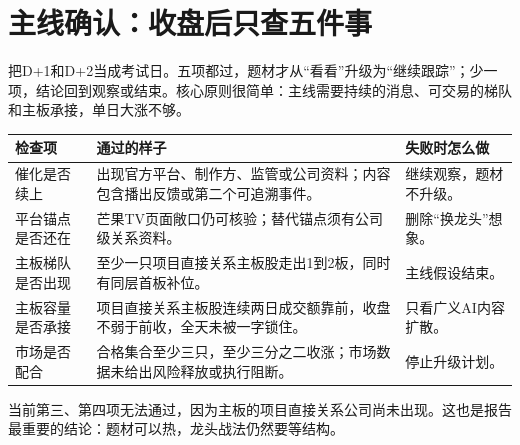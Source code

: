 \section{主线确认：收盘后只查五件事}

把D+1和D+2当成考试日。五项都过，题材才从“看看”升级为“继续跟踪”；少一项，结论回到观察或结束。核心原则很简单：主线需要持续的消息、可交易的梯队和主板承接，单日大涨不够。

\begin{exhibitbox}[展品：五项检查表]
\begin{tabularx}{\textwidth}{L{2.2cm}X X}
\toprule
检查项 & 通过的样子 & 失败时怎么做 \\
\midrule
催化是否续上 & 出现官方平台、制作方、监管或公司资料；内容包含播出反馈或第二个可追溯事件。 & 继续观察，题材不升级。 \\
平台锚点是否还在 & 芒果TV页面敞口仍可核验；替代锚点须有公司级关系资料。 & 删除“换龙头”想象。 \\
主板梯队是否出现 & 至少一只项目直接关系主板股走出1到2板，同时有同层首板补位。 & 主线假设结束。 \\
主板容量是否承接 & 项目直接关系主板股连续两日成交额靠前，收盘不弱于前收，全天未被一字锁住。 & 只看广义AI内容扩散。 \\
市场是否配合 & 合格集合至少三只，至少三分之二收涨；市场数据未给出风险释放或执行阻断。 & 停止升级计划。 \\
\bottomrule
\end{tabularx}
\end{exhibitbox}

当前第三、第四项无法通过，因为主板的项目直接关系公司尚未出现。这也是报告最重要的结论：题材可以热，龙头战法仍然要等结构。
